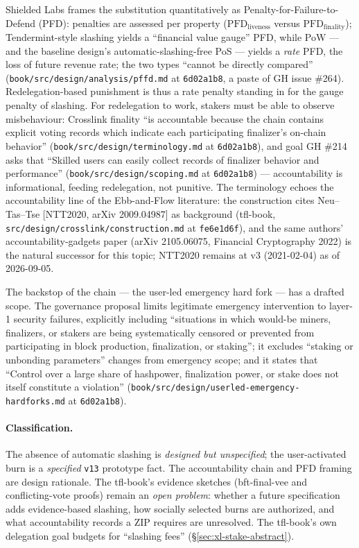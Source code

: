 \documentclass[11pt,a4paper]{article}
\theoremstyle{definition}
\begin{document}
Shielded Labs frames the substitution quantitatively as
Penalty-for-Failure-to-Defend (PFD): penalties are assessed per property
($\mathrm{PFD}_{\mathrm{liveness}}$ versus
$\mathrm{PFD}_{\mathrm{finality}}$); Tendermint-style slashing yields a
``financial value gauge'' PFD, while PoW --- and the baseline design's
automatic-slashing-free PoS --- yields a \emph{rate} PFD, the loss of future
revenue rate; the two types ``cannot be directly compared''
(\texttt{book/src/design/analysis/pffd.md} at \texttt{6d02a1b8}, a paste
of GH issue \#264). Redelegation-based punishment is thus a rate penalty
standing in for the gauge penalty of slashing. For redelegation to work,
stakers must be able to observe misbehaviour: Crosslink finality ``is
accountable because the chain contains explicit voting records which
indicate each participating finalizer's on-chain behavior''
(\texttt{book/src/design/terminology.md} at \texttt{6d02a1b8}), and goal
GH \#214 asks that ``Skilled users can easily collect records of
finalizer behavior and performance''
(\texttt{book/src/design/scoping.md} at \texttt{6d02a1b8}) ---
accountability is informational, feeding redelegation, not punitive. The
terminology echoes the accountability line of the Ebb-and-Flow
literature: the construction cites Neu--Tas--Tse [NTT2020, arXiv
2009.04987] as background (tfl-book,
\texttt{src/design/crosslink/construction.md} at \texttt{fe6e1d6f}), and
the same authors' accountability-gadgets paper (arXiv 2105.06075,
Financial Cryptography 2022) is the natural successor for this topic;
NTT2020 remains at v3 (2021-02-04) as of 2026-09-05.

The backstop of the chain --- the user-led emergency hard fork --- has a
drafted scope. The governance proposal limits legitimate emergency
intervention to layer-1 security failures, explicitly including
``situations in which would-be miners, finalizers, or stakers are being
systematically censored or prevented from participating in block
production, finalization, or staking''; it excludes ``staking or
unbonding parameters'' changes from emergency scope; and it states that
``Control over a large share of hashpower, finalization power, or stake
does not itself constitute a violation''
(\texttt{book/src/design/userled-emergency-hardforks.md} at
\texttt{6d02a1b8}).

\paragraph{Classification.} The absence of automatic slashing is
\emph{designed but unspecified}; the user-activated burn is a
\emph{specified} \texttt{v13} prototype fact. The accountability chain
and PFD framing are design rationale. The tfl-book's evidence sketches
(bft-final-vee and conflicting-vote proofs) remain an \emph{open problem}:
whether a future specification adds evidence-based slashing, how socially
selected burns are authorized, and what accountability records a ZIP
requires are unresolved. The tfl-book's own delegation goal budgets for
``slashing fees'' (\S\ref{sec:xl-stake-abstract}).
\end{document}
